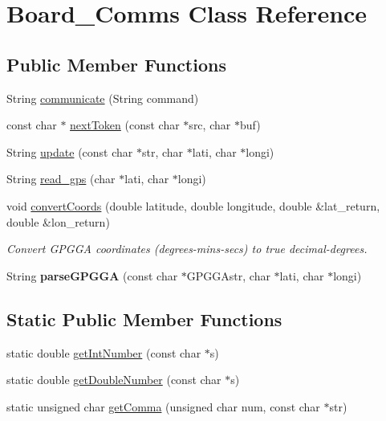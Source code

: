 \hypertarget{classBoard__Comms}{}\section{Board\+\_\+\+Comms Class Reference}
\label{classBoard__Comms}
\subsection*{Public Member Functions}
\begin{DoxyCompactItemize}
\item 
String \hyperlink{classBoard__Comms_a2d588f74ca20911975bdcea2a4077619}{communicate} (String command)
\item 
const char $\ast$ \hyperlink{classBoard__Comms_a7e988ac21e512865c45ca93442e524e2}{next\+Token} (const char $\ast$src, char $\ast$buf)
\item 
String \hyperlink{classBoard__Comms_a852e0274caa35cadbf52b9ef3c4ce177}{update} (const char $\ast$str, char $\ast$lati, char $\ast$longi)
\item 
String \hyperlink{classBoard__Comms_a13ed23184f2872e5412fed57540bc64a}{read\+\_\+gps} (char $\ast$lati, char $\ast$longi)
\item 
void \hyperlink{classBoard__Comms_a77909c27d9abde3dc309b0cfbc86eb13}{convert\+Coords} (double latitude, double longitude, double \&lat\+\_\+return, double \&lon\+\_\+return)
\begin{DoxyCompactList}\small\item\em Convert G\+P\+G\+GA coordinates (degrees-\/mins-\/secs) to true decimal-\/degrees. \end{DoxyCompactList}\item 
String {\bfseries parse\+G\+P\+G\+GA} (const char $\ast$G\+P\+G\+G\+Astr, char $\ast$lati, char $\ast$longi)\hypertarget{classBoard__Comms_a8829ac3c5f2b2c471a12b424e3451b57}{}\label{classBoard__Comms_a8829ac3c5f2b2c471a12b424e3451b57}

\end{DoxyCompactItemize}
\subsection*{Static Public Member Functions}
\begin{DoxyCompactItemize}
\item 
static double \hyperlink{classBoard__Comms_ad455b779065380b068771202cff513ee}{get\+Int\+Number} (const char $\ast$s)
\item 
static double \hyperlink{classBoard__Comms_a66f2a51965051c75f0e8b09be661cd0a}{get\+Double\+Number} (const char $\ast$s)
\item 
static unsigned char \hyperlink{classBoard__Comms_a9ac1a04d81fc4ff6f594704924c5e2e1}{get\+Comma} (unsigned char num, const char $\ast$str)
\end{DoxyCompactItemize}


